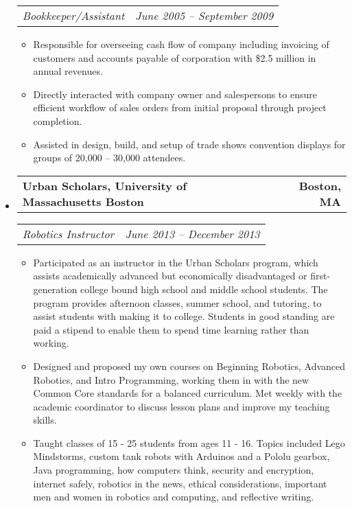 \documentclass[10pt,letterpaper]{article}
\makeatletter
\newcommand{\headerrow}[2]
{\begin{tabular*}{\linewidth}{l@{\extracolsep{\fill}}r}
	#1 & #2 \\
\end{tabular*}}
\makeatother
\begin{document}
\begin{itemize}
	\headerrow
		{\emph{Bookkeeper/Assistant}}
		{\emph{June 2005 -- September 2009}}
	\begin{itemize}
        \item Responsible for overseeing cash flow of company including
            invoicing of customers and accounts payable of corporation with
            \$2.5 million in annual revenues.

        \item Directly interacted with company owner and salespersons to ensure
            efficient workflow of sales orders from initial proposal through
            project completion.

        \item Assisted in design, build, and setup of trade shows convention
            displays for groups of 20,000 -- 30,000 attendees.
	\end{itemize}

    \item
    \headerrow
		{\textbf{Urban Scholars, University of Massachusetts Boston}}
		{\textbf{Boston, MA}}
	\headerrow
		{\emph{Robotics Instructor}}
		{\emph{June 2013 -- December 2013}}
	\begin{itemize}
        \item Participated as an instructor in the Urban Scholars program,
            which assists academically advanced but economically disadvantaged
            or first-generation college bound high school and middle school
            students.  The program provides afternoon classes, summer school,
            and tutoring, to assist students with making it to college.
            Students in good standing are paid a stipend to enable them to
            spend time learning rather than working.

        \item Designed and proposed my own courses on Beginning Robotics,
            Advanced Robotics, and Intro Programming, working them in with the
            new Common Core standards for a balanced curriculum.  Met weekly
            with the academic coordinator to discuss lesson plans and improve
            my teaching skills.

        \item Taught classes of 15 - 25 students from ages 11 - 16.  Topics
            included Lego Mindstorms, custom tank robots with Arduinos and a
            Pololu gearbox, Java programming, how computers think, security and
            encryption, internet safely, robotics in the news, ethical
            considerations, important men and women in robotics and computing,
            and reflective writing.
	\end{itemize}


\end{itemize}
\end{document}
